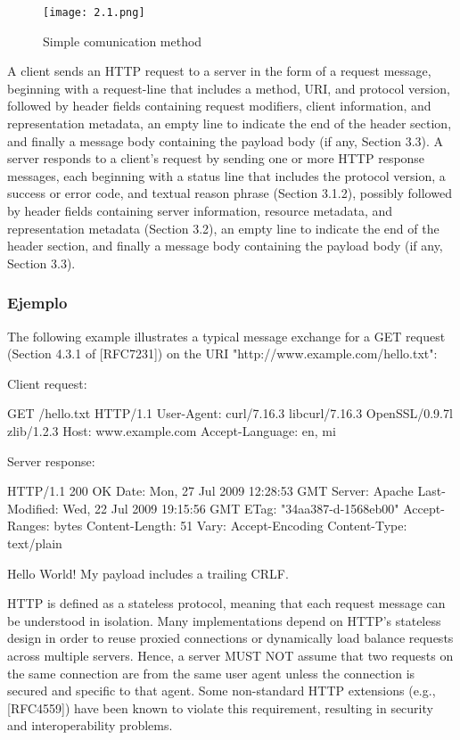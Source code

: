 \begin{center}
   \begin{figure}   
      \begin{center}
         \texttt{[image: 2.1.png]}
      \end{center}
      \caption{Simple comunication method}
   \end{figure}
\end{center}


A client sends an HTTP request to a server in the form of a request
message, beginning with a request-line that includes a method, URI,
and protocol version, followed by header fields
containing request modifiers, client information, and representation
metadata, an empty line to indicate the end of the
header section, and finally a message body containing the payload
body (if any, Section 3.3).
A server responds to a client's request by sending one or more HTTP
   response messages, each beginning with a status line that includes
   the protocol version, a success or error code, and textual reason
   phrase (Section 3.1.2), possibly followed by header fields containing
   server information, resource metadata, and representation metadata
   (Section 3.2), an empty line to indicate the end of the header
   section, and finally a message body containing the payload body (if
   any, Section 3.3).
\subsubsection*{Ejemplo}
The following example illustrates a typical message exchange for a
GET request (Section 4.3.1 of [RFC7231]) on the URI
"http://www.example.com/hello.txt":

Client request:

  GET /hello.txt HTTP/1.1
  User-Agent: curl/7.16.3 libcurl/7.16.3 OpenSSL/0.9.7l zlib/1.2.3
  Host: www.example.com
  Accept-Language: en, mi


Server response:

  HTTP/1.1 200 OK
  Date: Mon, 27 Jul 2009 12:28:53 GMT
  Server: Apache
  Last-Modified: Wed, 22 Jul 2009 19:15:56 GMT
  ETag: "34aa387-d-1568eb00"
  Accept-Ranges: bytes
  Content-Length: 51
  Vary: Accept-Encoding
  Content-Type: text/plain

  Hello World! My payload includes a trailing CRLF.

  HTTP is defined as a stateless protocol, meaning that each request
   message can be understood in isolation.  Many implementations depend
   on HTTP's stateless design in order to reuse proxied connections or
   dynamically load balance requests across multiple servers.  Hence, a
   server MUST NOT assume that two requests on the same connection are
   from the same user agent unless the connection is secured and
   specific to that agent.  Some non-standard HTTP extensions (e.g.,
   [RFC4559]) have been known to violate this requirement, resulting in
   security and interoperability problems.

